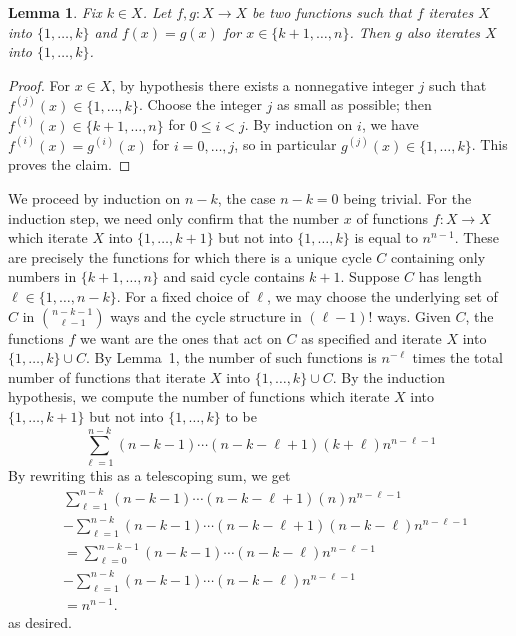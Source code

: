 \documentclass[amssymb,twocolumn,pra,10pt,aps]{revtex4-1}
\newtheorem{lemma}{Lemma}
\begin{document}
\begin{itemize}
\begin{lemma}
Fix $k \in X$. Let $f,g: X \to X$ be two functions such that $f$ iterates $X$ into $\{1,\dots,k\}$ and $f(x) = g(x)$ for $x \in \{k+1,\dots,n\}$. Then $g$ also iterates $X$ into $\{1,\dots,k\}$.
\end{lemma}
\begin{proof}
For $x \in X$, by hypothesis there exists a nonnegative integer $j$ such that $f^{(j)}(x) \in \{1,\dots,k\}$. Choose the integer $j$ as small as possible; then $f^{(i)}(x) \in \{k+1,\dots,n\}$ for $0 \leq i<j$. By induction on $i$, we have $f^{(i)}(x) = g^{(i)}(x)$ for $i=0,\dots,j$, so in particular $g^{(j)}(x) \in \{1,\dots,k\}$. This proves the claim.
\end{proof}

We proceed by induction on $n-k$, the case $n-k=0$ being trivial.
For the induction step, we need only confirm that the number $x$ of functions $f: X \to X$ which iterate $X$ into $\{1,\dots,k+1\}$ but not into $\{1,\dots,k\}$ is equal to $n^{n-1}$. These are precisely the functions for which there is a unique cycle $C$ containing only numbers in $\{k+1,\dots,n\}$ and said cycle contains $k+1$. Suppose $C$ has length $\ell \in \{1,\dots,n-k\}$. For a fixed choice of $\ell$, we may choose the underlying set of $C$ in
$\binom{n-k-1}{\ell-1}$ ways and the cycle structure in $(\ell-1)!$ ways. Given $C$, the functions $f$ we want are the ones that act on $C$ as specified and iterate $X$ into
$\{1,\dots,k\} \cup C$.
By Lemma~1, the number of such functions is
$n^{-\ell}$ times the total number of functions that iterate $X$ into
$\{1,\dots,k\} \cup C$.
By the induction hypothesis,
we compute the number of functions  which iterate $X$ into $\{1,\dots,k+1\}$ but not into $\{1,\dots,k\}$ to be
\[
\sum_{\ell=1}^{n-k} (n-k-1)\cdots(n-k-\ell+1)
(k+\ell) n^{n-\ell-1}
\]
By rewriting this as a telescoping sum, we get
\begin{align*}
&\sum_{\ell=1}^{n-k} (n-k-1)\cdots(n-k-\ell+1)
(n) n^{n-\ell-1} \\
&- \sum_{\ell=1}^{n-k} (n-k-1)\cdots(n-k-\ell+1)
(n-k-\ell) n^{n-\ell-1} \\
&=\sum_{\ell=0}^{n-k-1} (n-k-1)\cdots(n-k-\ell) n^{n-\ell-1} \\
&- \sum_{\ell=1}^{n-k} (n-k-1)\cdots
(n-k-\ell) n^{n-\ell-1} \\
&= n^{n-1}.
\end{align*}
as desired.


\end{itemize}
\end{document}
